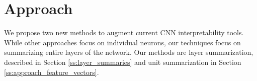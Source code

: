 \section{Approach}

We propose two new methods to augment current CNN interpretability tools. While other approaches focus on individual neurons, our techniques focus on summarizing entire layers of the network. Our methods are layer summarization, described in Section \ref{ss:layer_summaries} and unit summarization in Section \ref{ss:approach_feature_vectors}.





